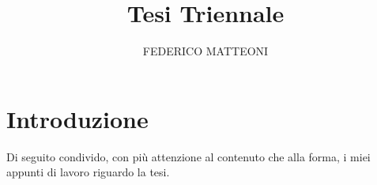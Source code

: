 \documentclass[11pt, a4paper, twoside, openright]{book}
\title{Tesi Triennale}
\author{FEDERICO MATTEONI}
\begin{document}
	
	\frontmatter
	\begin{titlepage}
		\thispagestyle{empty}
		
		\thispagestyle{empty}
		\cleardoublepage
	\end{titlepage}	
	
	\cleardoublepage
	\tableofcontents
	\cleardoublepage
	\listoffigures
	\cleardoublepage
	\listoftables
	
	
    
    \mainmatter

    \backmatter
	
	
	
\iffalse
\section{Introduzione}
Di seguito condivido, con più attenzione al contenuto che alla forma, i miei appunti di lavoro riguardo la tesi.
\pagebreak
\end{document}
